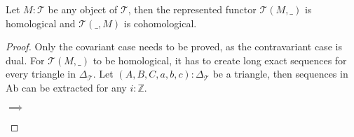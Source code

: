     \begin{lemma}
        Let $M:\mathcal{T}$ be any object of $\mathcal{T}$, then the represented functor $\mathcal{T}(M,\_)$ is homological and $\mathcal{T}(\_,M)$ is cohomological.
    \end{lemma}

    \begin{proof}
        Only the covariant case needs to be proved, as the contravariant case is dual. For $\mathcal{T}(M,\_)$ to be homological, it has to create long exact sequences for every triangle in $\Delta_{\mathcal{T}}$. Let $(A,B,C,a,b,c):\Delta_{\mathcal{T}}$ be a triangle, then sequences in Ab can be extracted for any $i:\mathbb{Z}$.

        \begin{center}
             $\implies$
        \end{center}


\end{proof}

